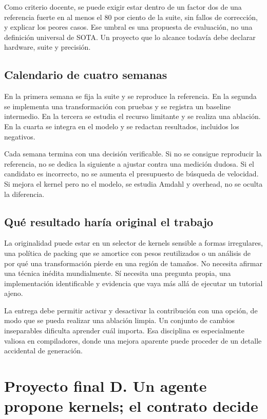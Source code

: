 \documentclass[12pt,a4paper,oneside]{report}
\begin{document}
\begin{practica}
Como criterio docente, se puede exigir estar dentro de un factor dos de una referencia fuerte en al menos el 80 por ciento de la suite, sin fallos de corrección, y explicar los peores casos. Ese umbral es una propuesta de evaluación, no una definición universal de SOTA. Un proyecto que lo alcance todavía debe declarar hardware, suite y precisión.

\end{practica}
\section{Calendario de cuatro semanas}
En la primera semana se fija la suite y se reproduce la referencia. En la segunda se implementa una transformación con pruebas y se registra un baseline intermedio. En la tercera se estudia el recurso limitante y se realiza una ablación. En la cuarta se integra en el modelo y se redactan resultados, incluidos los negativos.

Cada semana termina con una decisión verificable. Si no se consigue reproducir la referencia, no se dedica la siguiente a ajustar contra una medición dudosa. Si el candidato es incorrecto, no se aumenta el presupuesto de búsqueda de velocidad. Si mejora el kernel pero no el modelo, se estudia Amdahl y overhead, no se oculta la diferencia.

\section{Qué resultado haría original el trabajo}
La originalidad puede estar en un selector de kernels sensible a formas irregulares, una política de packing que se amortice con pesos reutilizados o un análisis de por qué una transformación pierde en una región de tamaños. No necesita afirmar una técnica inédita mundialmente. Sí necesita una pregunta propia, una implementación identificable y evidencia que vaya más allá de ejecutar un tutorial ajeno.

La entrega debe permitir activar y desactivar la contribución con una opción, de modo que se pueda realizar una ablación limpia. Un conjunto de cambios inseparables dificulta aprender cuál importa. Esa disciplina es especialmente valiosa en compiladores, donde una mejora aparente puede proceder de un detalle accidental de generación.

\chapter{Proyecto final D. Un agente propone kernels; el contrato decide}
\label{project:agente}
\end{document}
